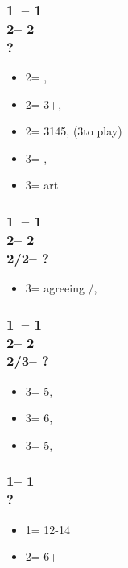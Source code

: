 \documentclass[12pt, a4paper]{article}
\begin{document}
\subsubsection*{1\clubs\ -- 1\spades \\ 
                2\clubs -- 2\diams\\
                ?}
\begin{itemize}
    \item 2\hearts = \nat, \fonce
    \item 2\spades = 3+\spades, \fonce
    \item 2\nt = 3145, \nf (3\diams to play)
    \item 3\clubs = \nat, \nf
    \item 3\diams = \gf art\vimp
\end{itemize}

\subsubsection*{1\clubs\ -- 1\spades \\ 
                2\clubs -- 2\diams\\
                2\hearts/2\spades -- ?}
\begin{itemize}
    \item 3\diams = agreeing \hearts/\spades, \gf
\end{itemize}

\subsubsection*{1\clubs\ -- 1\spades \\ 
                2\clubs -- 2\diams\\
                2\nt/3\clubs -- ?}
\begin{itemize}
    \item 3\hearts = 5\hearts, \gf
    \item 3\spades = 6\hearts, \gf
    \item 3\nt = 5\hearts, \gf
\end{itemize}

\subsubsection*{1\diams -- 1\hearts\\ ?}
\begin{itemize}
    \item 1\nt = 12-14 \bal
    \item 2\diams = 6+\diams
\end{itemize}
\end{document}
